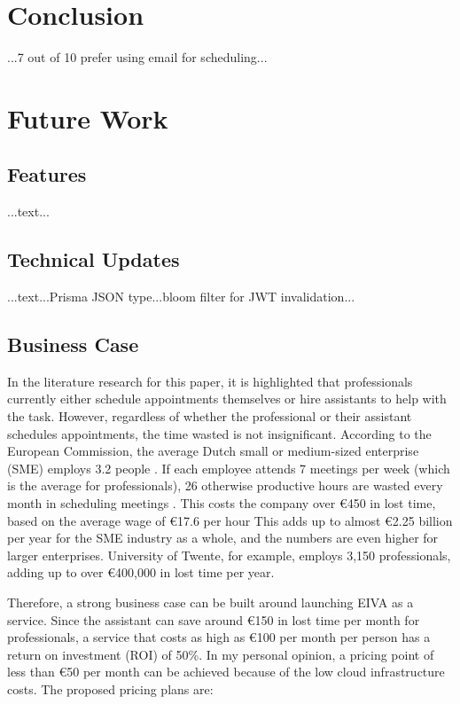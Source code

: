 \documentclass{article}
\begin{document}
\newpage

\section{Conclusion}

...7 out of 10 prefer using email for scheduling...

\newpage

\section{Future Work}

\subsection{Features}

...text...

\subsection{Technical Updates}

...text...Prisma JSON type...bloom filter for JWT invalidation...

\subsection{Business Case}

In the literature research for this paper, it is highlighted that professionals currently either schedule appointments themselves or hire assistants to help with the task. However, regardless of whether the professional or their assistant schedules appointments, the time wasted is not insignificant. According to the European Commission, the average Dutch small or medium-sized enterprise (SME) employs 3.2 people \cite{noauthor_2019_2019}. If each employee attends 7 meetings per week (which is the average for professionals), 26 otherwise productive hours are wasted every month in scheduling meetings \cite{kincaid_electronic_1985}. This costs the company over €450 in lost time, based on the average wage of €17.6 per hour \cite{noauthor_salary_nodate} This adds up to almost €2.25 billion per year for the SME industry as a whole, and the numbers are even higher for larger enterprises. University of Twente, for example, employs 3,150 professionals, adding up to over €400,000 in lost time per year.

Therefore, a strong business case can be built around launching EIVA as a service. Since the assistant can save around €150 in lost time per month for professionals, a service that costs as high as €100 per month per person has a return on investment (ROI) of 50\%. In my personal opinion, a pricing point of less than €50 per month can be achieved because of the low cloud infrastructure costs. The proposed pricing plans are:
\end{document}
